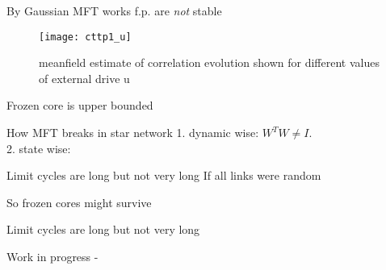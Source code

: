 \documentclass[xcolor=x11names,compress]{beamer}
\renewcommand{\(}{\begin{columns}}
\renewcommand{\)}{\end{columns}}
\newcommand{\<}[1]{\begin{column}{#1}}
\renewcommand{\>}{\end{column}}
\begin{document}
	\begin{frame}[t]{By Gaussian MFT works f.p. are \textit{not} stable}		
	\begin{figure}
		\centering
		\texttt{[image: cttp1\_u]}
		\caption{meanfield estimate of correlation evolution shown for different values of external drive u}
		\label{fig:cttp1u}
	\end{figure}	
	\end{frame}
	
		\begin{frame}[t]{Frozen core is upper bounded}
			
		\end{frame}

	
	\begin{frame}[t]{How MFT breaks in star network}
		1. dynamic wise: $W^TW\ne I$.\\
		2. state wise: %
	\end{frame}

	\begin{frame}[t]{Limit cycles are long but not very long}
		If all links were random %
	\end{frame}

	\begin{frame}[t]{So frozen cores might  survive}
		
	\end{frame}

	\begin{frame}[t]{Limit cycles are long but not very long}
		
	\end{frame}
	
		\begin{frame}[t]{Work in progress - }
			
		\end{frame}		
	
	
%
\end{document}
